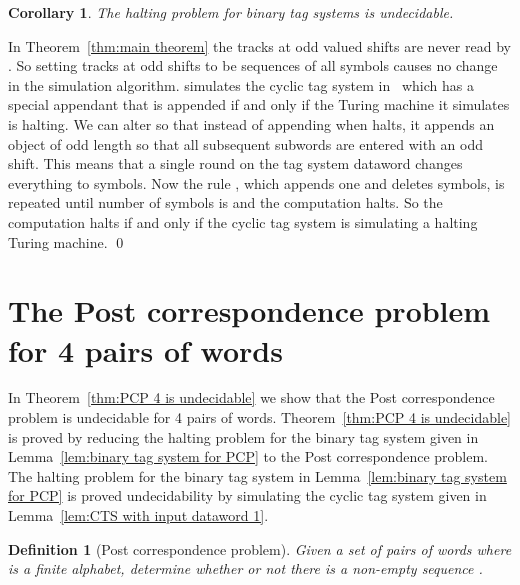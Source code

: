 \documentclass[11pt]{article} \usepackage{amsfonts,amsmath,amssymb,amsthm}
\renewenvironment{proof}{{\bfseries\noindent Proof.}}{\qed\vspace{3.5ex}}
\newtheorem{corollary}{Corollary}
\newtheorem{definition}{Definition}
\begin{document}
\begin{corollary}\label{cor:2 symbol tag halting problem}
The halting problem for binary tag systems is undecidable.
\end{corollary}
\begin{proof}
In Theorem~\ref{thm:main theorem} the  tracks at odd valued shifts are never read by . So setting  tracks at odd shifts to be sequences of all  symbols causes no change in the simulation algorithm.  simulates the cyclic tag system in~\cite{NearyWoods2006C} which has a special appendant  that is appended if and only if the Turing machine it simulates is halting. 
We can alter  so that instead of appending  when  halts, it appends an object of odd length so that all subsequent  subwords are entered with an odd shift. This means that a single round on the tag system dataword changes everything to  symbols. 
Now the rule , which appends one  and deletes  symbols, is repeated until number of symbols is  and the computation halts. So the computation halts if and only if the cyclic tag system is simulating a halting Turing machine.
\end{proof}




\section{The Post correspondence problem for 4 pairs of words}
In Theorem~\ref{thm:PCP 4 is undecidable} we show that the Post correspondence problem is undecidable for 4 pairs of words. Theorem~\ref{thm:PCP 4 is undecidable} is proved by reducing the halting problem for the binary tag system given in Lemma~\ref{lem:binary tag system for PCP} to the Post correspondence problem. The halting problem for the binary tag system in Lemma~\ref{lem:binary tag system for PCP} is proved undecidability by simulating the cyclic tag system given in Lemma~\ref{lem:CTS with input dataword 1}. 

\begin{definition}[Post correspondence problem]\label{def:PCP}
Given a set of pairs of words  where  is a finite alphabet, determine whether or not there is a non-empty sequence . 
\end{definition}
\end{document}
